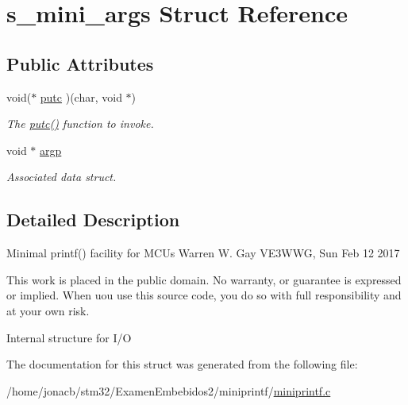 \hypertarget{structs__mini__args}{}\section{s\+\_\+mini\+\_\+args Struct Reference}
\label{structs__mini__args}
\subsection*{Public Attributes}
\begin{DoxyCompactItemize}
\item 
\mbox{\label{structs__mini__args_a150c5c7a07d3aa0301fae09b17d3e43f}} 
void($\ast$ \hyperlink{structs__mini__args_a150c5c7a07d3aa0301fae09b17d3e43f}{putc} )(char, void $\ast$)
\begin{DoxyCompactList}\small\item\em The \hyperlink{structs__mini__args_a150c5c7a07d3aa0301fae09b17d3e43f}{putc()} function to invoke. \end{DoxyCompactList}\item 
\mbox{\label{structs__mini__args_ae4547bc8c8a470df0e6d60b02d15ed37}} 
void $\ast$ \hyperlink{structs__mini__args_ae4547bc8c8a470df0e6d60b02d15ed37}{argp}
\begin{DoxyCompactList}\small\item\em Associated data struct. \end{DoxyCompactList}\end{DoxyCompactItemize}


\subsection{Detailed Description}
Minimal printf() facility for M\+C\+Us Warren W. Gay V\+E3\+W\+WG, Sun Feb 12 2017

This work is placed in the public domain. No warranty, or guarantee is expressed or implied. When uou use this source code, you do so with full responsibility and at your own risk.

Internal structure for I/O 

The documentation for this struct was generated from the following file\+:\begin{DoxyCompactItemize}
\item 
/home/jonacb/stm32/\+Examen\+Embebidos2/miniprintf/\hyperlink{miniprintf_8c}{miniprintf.\+c}\end{DoxyCompactItemize}
